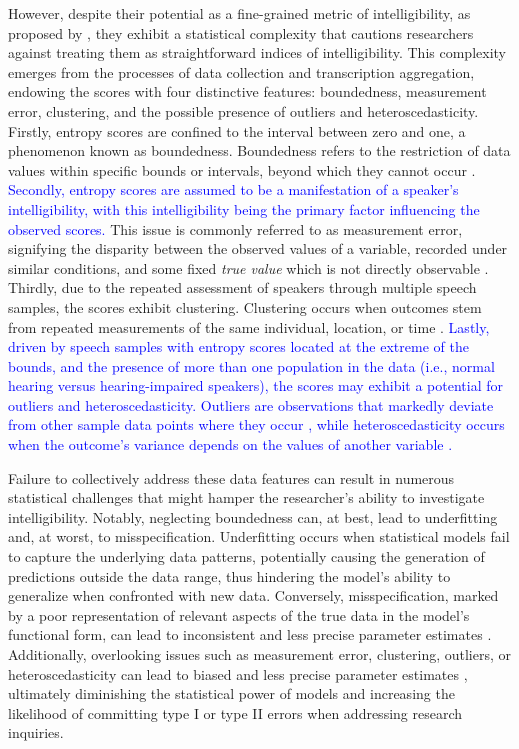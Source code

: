 \documentclass[
  authoryear,
  preprint,
  1p]{elsarticle}
\begin{document}
However, despite their potential as a fine-grained metric of
intelligibility, as proposed by \citet{Boonen_et_al_2021}, they exhibit
a statistical complexity that cautions researchers against treating them
as straightforward indices of intelligibility. This complexity emerges
from the processes of data collection and transcription aggregation,
endowing the scores with four distinctive features: boundedness,
measurement error, clustering, and the possible presence of outliers and
heteroscedasticity. Firstly, entropy scores are confined to the interval
between zero and one, a phenomenon known as boundedness. Boundedness
refers to the restriction of data values within specific bounds or
intervals, beyond which they cannot occur \citep{Lebl_2022}. \textcolor{blue}{Secondly,
entropy scores are assumed to be a manifestation of a speaker's
intelligibility, with this intelligibility being the primary factor
influencing the observed scores.} This issue is commonly referred to as
measurement error, signifying the disparity between the observed values
of a variable, recorded under similar conditions, and some fixed
\emph{true value} which is not directly observable
\citep{Everitt_et_al_2010}. Thirdly, due to the repeated assessment of
speakers through multiple speech samples, the scores exhibit clustering.
Clustering occurs when outcomes stem from repeated measurements of the
same individual, location, or time \citep{McElreath_2020}. \textcolor{blue}{Lastly,
driven by speech samples with entropy scores located at the extreme of
the bounds, and the presence of more than one population in the data
(i.e., normal hearing versus hearing-impaired speakers), the scores may
exhibit a potential for outliers and heteroscedasticity. Outliers are
observations that markedly deviate from other sample data points where
they occur \citep{Grubbs_1969}, while heteroscedasticity occurs when the
outcome's variance depends on the values of another variable
\citep{Everitt_et_al_2010}.}

Failure to collectively address these data features can result in
numerous statistical challenges that might hamper the researcher's
ability to investigate intelligibility. Notably, neglecting boundedness
can, at best, lead to underfitting and, at worst, to misspecification.
Underfitting occurs when statistical models fail to capture the
underlying data patterns, potentially causing the generation of
predictions outside the data range, thus hindering the model's ability
to generalize when confronted with new data. Conversely,
misspecification, marked by a poor representation of relevant aspects of
the true data in the model's functional form, can lead to inconsistent
and less precise parameter estimates \citep{Everitt_et_al_2010}.
Additionally, overlooking issues such as measurement error, clustering,
outliers, or heteroscedasticity can lead to biased and less precise
parameter estimates \citep{McElreath_2020}, ultimately diminishing the
statistical power of models and increasing the likelihood of committing
type I or type II errors when addressing research inquiries.
\end{document}
